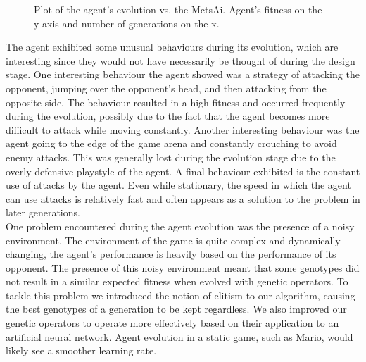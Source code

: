 \documentclass[12pt,a4paper]{article}
\begin{document}
\begin{figure}[h]
\begin{center}
\end{center}
\caption{Plot of the agent's evolution vs. the MctsAi. Agent's fitness on the y-axis and number of generations on the x.}
\end{figure}
\newpage
The agent exhibited some unusual behaviours during its evolution, which are interesting since they would not have necessarily be thought of during the design stage. One interesting behaviour the agent showed was a strategy of attacking the opponent, jumping over the opponent's head, and then attacking from the opposite side. The behaviour resulted in a high fitness and occurred frequently during the evolution, possibly due to the fact that the agent becomes more difficult to attack while moving constantly. Another interesting behaviour was the agent going to the edge of the game arena and constantly crouching to avoid enemy attacks. This was generally lost during the evolution stage due to the overly defensive playstyle of the agent. A final behaviour exhibited is the constant use of attacks by the agent. Even while stationary, the speed in which the agent can use attacks is relatively fast and often appears as a solution to the problem in later generations.\\ 

One problem encountered during the agent evolution was the presence of a noisy environment. The environment of the game is quite complex and dynamically changing, the agent's performance is heavily based on the performance of its opponent. The presence of this noisy environment meant that some genotypes did not result in a similar expected fitness when evolved with genetic operators. To tackle this problem we introduced the notion of elitism to our algorithm, causing the best genotypes of a generation to be kept regardless. We also improved our genetic operators to operate more effectively based on their application to an artificial neural network. Agent evolution in a static game, such as Mario, would likely see a smoother learning rate.\\
\end{document}
